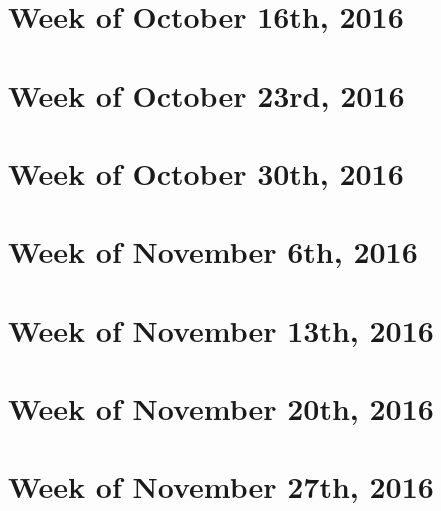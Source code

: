 \documentclass{article}
\begin{document}
\section{Week of October 16th, 2016}
\section{Week of October 23rd, 2016}
\section{Week of October 30th, 2016}
\section{Week of November 6th, 2016}
\section{Week of November 13th, 2016}
\section{Week of November 20th, 2016}
\section{Week of November 27th, 2016}
\end{document}
